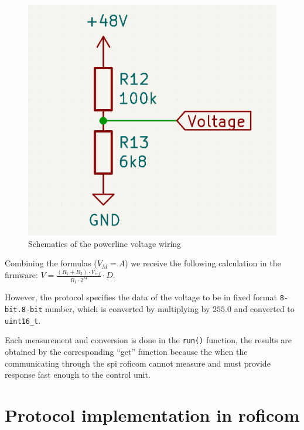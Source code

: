 \documentclass[
  digital,     %
  oneside,     %
  nosansbold,  %
  nocolorbold, %
  nolof,         %
  nolot,         %
]{fithesis4}
\newcommand{\TODO}[1]{\textcolor{red}{\textit{#1}}}
\newcommand{\TODOLIST}[1]{}
\begin{document}
{{{\begin{figure}
    \includegraphics[scale=0.2,keepaspectratio]{assets/power-voltage.png}
    \caption{ Schematics of the powerline voltage wiring }
    \label{fig:power-voltage}
\end{figure}

Combining the formulas ($V_M = A$) we receive the following calculation in the firmware: $V = \frac{(R_1 + R_2) \cdot V_{ref}}{R_1 \cdot 2^{M}} \cdot D$.

However, the protocol specifies the data of the voltage to be in fixed format \verb|8-bit.8-bit| number, which is converted by multiplying by $255.0$ and converted to \lstinline|uint16_t|.

Each measurement and conversion is done in the \lstinline|run()| function, the results are obtained by the corresponding ``get'' function because the when the communicating through the \acrshort{spi} \acrshort{roficom} cannot measure and must provide response fast enough to the control unit.

\section[ Protocol Implementation in RoFICoM ]{ Protocol implementation in \acrshort{roficom} }
\TODOLIST{
\begin{itemize}
    \item Added power information - connection of INT and EXT, current and voltage of INT and EXT.
    \item Connection to mating side.
    \item Lidar status and distance and setting \TODO{ distance mode ?? }.
\end{itemize}
}

}}}
\end{document}
